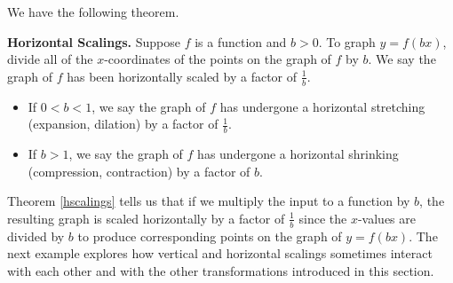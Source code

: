 We have the following theorem.

\smallskip

\bbm


\begin{thm} \label{hscalings}\textbf{Horizontal Scalings.}  Suppose $f$ is a function and $b>0$.  To graph $y= f(bx)$, divide all of the $x$-coordinates of the points on the graph of $f$ by $b$. We say the graph of $f$ has been horizontally scaled by a factor of $\frac{1}{b}$. 

\begin{itemize}

\item If $0 < b < 1$, we say the graph of $f$ has undergone a horizontal stretching (expansion, dilation) by a factor of $\frac{1}{b}$. 

\item If $b>1$, we say the graph of $f$ has undergone a horizontal shrinking (compression, contraction) by a factor of $b$.

\end{itemize}

\end{thm}

\ebm


Theorem \ref{hscalings} tells us that if we multiply the input to a function by $b$, the resulting graph is scaled horizontally by a factor of $\frac{1}{b}$ since the $x$-values are divided by $b$ to produce corresponding points on the graph of $y = f(bx)$.    The next example explores how vertical and horizontal scalings sometimes interact with each other and with the other transformations introduced in this section. 



